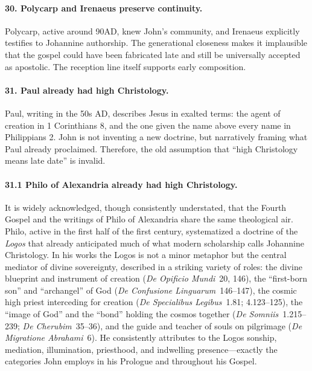 \paragraph{30.
Polycarp and Irenaeus preserve continuity.}\label{par:polycarp-and-irenaeus-preserve-continuity.}

Polycarp, active around 90AD, knew John’s community, and Irenaeus explicitly testifies to Johannine authorship.
The generational closeness makes it implausible that the gospel could have been fabricated late and still be universally accepted as apostolic.
The reception line itself supports early composition.

\paragraph{31.
Paul already had high Christology.}\label{par:paul-already-had-high-christology.}

Paul, writing in the 50s AD, describes Jesus in exalted terms: the agent of creation in 1 Corinthians 8, and the one given the name above every name in Philippians 2.
John is not inventing a new doctrine, but narratively framing what Paul already proclaimed.
Therefore, the old assumption that “high Christology means late date” is invalid.

\paragraph{31.1
Philo of Alexandria already had high Christology.}\label{par:philo-of-alexandria-already-had-high-christology.}

It is widely acknowledged, though consistently understated, that the Fourth Gospel and the writings of Philo of Alexandria share the same theological air.
Philo, active in the first half of the first century, systematized a doctrine of the \emph{Logos} that already anticipated much of what modern scholarship calls Johannine Christology.
In his works the Logos is not a minor metaphor but the central mediator of divine sovereignty, described in a striking variety of roles:
the divine blueprint and instrument of creation (\emph{De Opificio Mundi}~20, 146),
the “first-born son” and “archangel” of God (\emph{De Confusione Linguarum}~146–147),
the cosmic high priest interceding for creation (\emph{De Specialibus Legibus}~1.81; 4.123–125),
the “image of God” and the “bond” holding the cosmos together (\emph{De Somniis}~1.215–239; \emph{De Cherubim}~35–36),
and the guide and teacher of souls on pilgrimage (\emph{De Migratione Abrahami}~6).
He consistently attributes to the Logos sonship, mediation, illumination, priesthood, and indwelling presence—exactly the categories John employs in his Prologue and throughout his Gospel.

